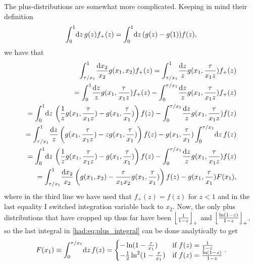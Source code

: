 \documentclass[../main.tex]{subfiles}
\begin{document}
The plus-distributions are somewhat more complicated.
Keeping in mind their definition
\begin{equation}
  \integral[_0^1]{z} g(z) f_+(z) = \integral[_0^1]{z} (g(z)-g(1)) f(z),
\end{equation}
we have that
\begin{align}
  \label{had:eq:plus_integral}
  \nonumber
  \int_{\tau/x_1}^1 \! \frac{\mathrm{d}x_2}{x_2} g(x_1, x_2) f_+(z) = \int_{\tau/x_1}^1 \! \frac{\mathrm{d}z}{z} g(x_1, \frac{\tau}{x_1z}) f_+(z)                                           \\
  \nonumber
  = \int_0^1 \! \frac{\mathrm{d}z}{z} g(x_1, \frac{\tau}{x_1 z}) f_+(z) - \int_0^{\tau/x_1} \! \frac{\mathrm{d}z}{z} g(x_1, \frac{\tau}{x_1 z}) f_+(z)                                      \\
  \nonumber
  = \int_0^1 \! \mathrm{d}z\, \pclosed{\frac{1}{z} g(x_1, \frac{\tau}{x_1 z}) - g(x_1, \frac{\tau}{x_1})} f(z) - \int_0^{\tau/x_1} \! \frac{\mathrm{d}z}{z} g(x_1, \frac{\tau}{x_1 z}) f(z) \\
  = \int_{\tau/x_1}^1 \! \frac{\mathrm{d}z}{z} \pclosed{g(x_1, \frac{\tau}{x_1 z}) - zg(x_1, \frac{\tau}{x_1})} f(z) - g(x_1, \frac{\tau}{x_1}) \integral[_0^{\tau/x_1}]{z} f(z)            \\
  = \int_0^1 \! \mathrm{d}z\, \pclosed{\frac{1}{z} g(x_1, \frac{\tau}{x_1 z}) - g(x_1, \frac{\tau}{x_1})} f(z) - \int_0^{\tau/x_1} \! \frac{\mathrm{d}z}{z} g(x_1, \frac{\tau}{x_1 z}) f(z) \\
  = \int_{\tau/x_1}^1 \! \frac{\mathrm{d}x_2}{x_2} \pclosed{g(x_1, x_2) - \frac{\tau}{x_1 x_2}g(x_1, \frac{\tau}{x_1})} f(z) - g(x_1, \frac{\tau}{x_1}) F(x_1),
\end{align}
where in the third line we have used that \(f_+(z) = f(z)\) for \(z < 1\) and in the last equality I switched integration variable back to \(x_2\).
Now, the only plus distributions that have cropped up thus far have been \(\plusdist{\frac{1}{1-z}}\) and \(\plusdist{\frac{\ln(1-z)}{1-z}}\), so the last integral in \cref{had:eq:plus_integral} can be done analytically to get
\begin{equation}
  F(x_1) \equiv \integral[_0^{\tau/x_1}]{z} f(z) = \begin{cases}
    -\ln(1-\frac{\tau}{x_1})              & \text{if } f(z) = \frac{1}{1-z}        \\
    -\frac{1}{2}\ln^2(1-\frac{\tau}{x_1}) & \text{if } f(z) = \frac{\ln(1-z)}{1-z}
  \end{cases}.
\end{equation}
\end{document}
